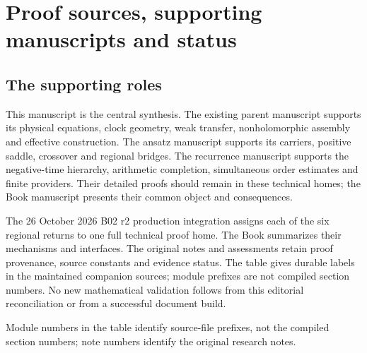\section{Proof sources, supporting manuscripts and status}
\label{sec:sources}

\subsection{The supporting roles}
This manuscript is the central synthesis. The existing parent manuscript
supports its physical equations, clock geometry, weak transfer,
nonholomorphic assembly and effective construction. The ansatz
manuscript supports its carriers, positive saddle, crossover and
regional bridges. The recurrence manuscript supports the negative-time
hierarchy, arithmetic completion, simultaneous order estimates and finite
providers. Their detailed proofs should remain in these technical homes;
the Book manuscript presents their common object and consequences.

The 26 October 2026 B02 r2 production integration assigns each of the
six regional returns to one full technical proof home. The Book summarizes
their mechanisms and interfaces. The original notes and assessments retain
proof provenance, source constants and evidence status. The table gives
durable labels in the maintained companion sources; module prefixes are
not compiled section numbers. No new mathematical validation follows from
this editorial reconciliation or from a successful document build.

Module numbers in the table identify source-file prefixes, not the
compiled section numbers; note numbers identify the original research notes.

